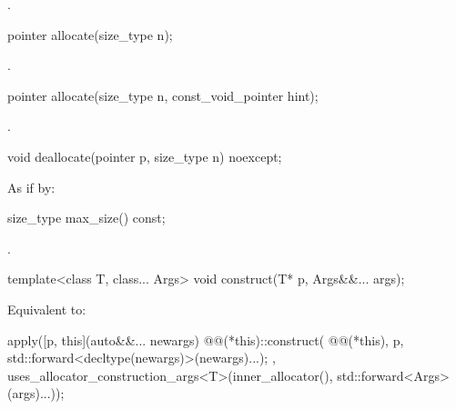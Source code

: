 \begin{itemdescr}
\pnum
\returns
{}.
\end{itemdescr}

%
\begin{itemdecl}
pointer allocate(size_type n);
\end{itemdecl}

\begin{itemdescr}
\pnum
\returns
{}.
\end{itemdescr}

%
\begin{itemdecl}
pointer allocate(size_type n, const_void_pointer hint);
\end{itemdecl}

\begin{itemdescr}
\pnum
\returns
{}.
\end{itemdescr}

%
\begin{itemdecl}
void deallocate(pointer p, size_type n) noexcept;
\end{itemdecl}

\begin{itemdescr}
\pnum
\effects
As if by:
\end{itemdescr}

%
\begin{itemdecl}
size_type max_size() const;
\end{itemdecl}

\begin{itemdescr}
\pnum
\returns
{}.
\end{itemdescr}

%
\begin{itemdecl}
template<class T, class... Args>
  void construct(T* p, Args&&... args);
\end{itemdecl}

\begin{itemdescr}
\pnum
\effects
Equivalent to:
\begin{codeblock}
apply([p, this](auto&&... newargs) {
        @@(*this)::construct(
          @@(*this), p,
          std::forward<decltype(newargs)>(newargs)...);
      },
      uses_allocator_construction_args<T>(inner_allocator(),
                                          std::forward<Args>(args)...));
\end{codeblock}
\end{itemdescr}

